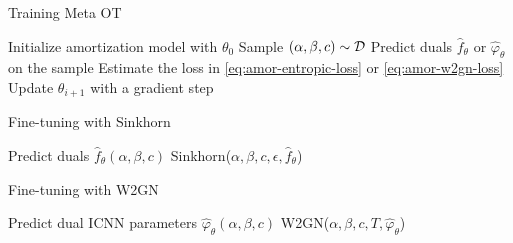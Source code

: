 
\begin{minipage}[t]{0.49\textwidth}
\begin{algorithm}[H]
    \caption{Training Meta OT}
    \begin{algorithmic}
    \footnotesize
    \State Initialize amortization model with $\theta_0$
    \State Sample $(\alpha, \beta, c)\sim{\mathcal{D}}$
    \State Predict duals $\hat f_\theta$ or $\hat \varphi_\theta$ on the sample
    \State Estimate the loss in \cref{eq:amor-entropic-loss} or \cref{eq:amor-w2gn-loss}
    \State Update $\theta_{i+1}$ with a gradient step
    \EndFor
    \end{algorithmic}
    \label{alg:meta-ot-training}
\end{algorithm}
\end{minipage}
\hfill
\begin{minipage}[t]{0.49\textwidth}
\begin{algorithm}[H]
    \caption{Fine-tuning with Sinkhorn}
    \begin{algorithmic}
    \footnotesize
    \State Predict duals $\hat f_\theta(\alpha, \beta, c)$
    \State \Return Sinkhorn($\alpha, \beta, c, \epsilon, \hat f_\theta$) %
    \end{algorithmic}
    \label{alg:sinkhorn-finetuning}
\end{algorithm}
\vspace*{-5mm}
\begin{algorithm}[H]
    \caption{Fine-tuning with W2GN}
    \begin{algorithmic}
    \footnotesize
    \State Predict dual ICNN parameters $\hat \varphi_\theta(\alpha, \beta, c)$
    \State \Return W2GN($\alpha, \beta, c, T, \hat \varphi_\theta$)
    \end{algorithmic}
    \label{alg:w2gn-finetuning}
\end{algorithm}
\end{minipage}

